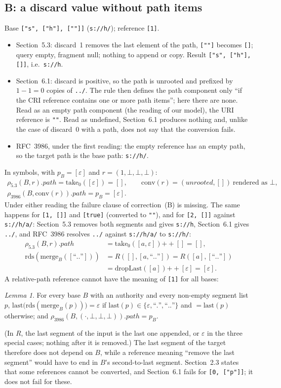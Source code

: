 \documentclass[11pt,a4paper]{article}
\theoremstyle{remark}
\newcommand{\cri}[1]{\texttt{#1}}
\newcommand{\uri}[1]{\texttt{#1}}
\newcommand{\rds}{\mathrm{rds}}
\newcommand{\mergef}{\mathrm{merge}}
\newcommand{\take}[1]{\mathrm{take}_{#1}}
\newcommand{\dl}{\mathrm{dropLast}}
\newcommand{\res}{\rho_{5.3}}
\newcommand{\rfc}{\rho_{3986}}
\newcommand{\conv}{\mathrm{conv}}
\newcommand{\e}{\varepsilon}
\newcommand{\seq}[1]{[#1]}
\newtheorem{lemma}{Lemma}
\begin{document}
\subsection{B: a discard value without path items}
Base \cri{["s", ["h"], [""]]} (\uri{s://h/}); reference \cri{[1]}.
\begin{itemize}[nosep]
\item Section~5.3: discard~1 removes the last element of the path, \cri{[""]} becomes \cri{[]}; query
empty, fragment null; nothing to append or copy. Result \cri{["s", ["h"], []]}, i.e.\ \uri{s://h}.
\item Section~6.1: discard is positive, so the path is unrooted and prefixed by $1-1=0$ copies of
\uri{../}. The rule then defines the path component only ``if the CRI reference contains one or more
path items''; here there are none. Read as an empty path component (the reading of our model), the URI
reference is \uri{""}. Read as undefined, Section~6.1 produces nothing and, unlike the case of discard~0
with a path, does not say that the conversion fails.
\item RFC~3986, under the first reading: the empty reference has an empty path, so the target path is the
base path: \uri{s://h/}.
\end{itemize}
In symbols, with $p_B=\seq{\e}$ and $r=(1,\bot,\bot,\bot)$:
\begin{gather*}
\res(B,r).\mathit{path}=\take{0}(\seq{\e})=\seq{},\qquad
\conv(r)=(\mathit{unrooted},\seq{})\ \text{rendered as }\bot,\\
\rfc(B,\conv(r)).\mathit{path}=p_B=\seq{\e}.
\end{gather*}
Under either reading the failure clause of correction~(B) is missing. The same happens for \cri{[1, []]}
and \cri{[true]} (converted to \uri{""}), and for \cri{[2, []]} against \uri{s://h/a/}: Section~5.3
removes both segments and gives \uri{s://h}, Section~6.1 gives \uri{../}, and RFC~3986 resolves
\uri{../} against \uri{s://h/a/} to \uri{s://h/}:
\begin{align*}
\res(B,r).\mathit{path}&=\take{0}(\seq{a,\e})\mathbin{+\!\!+}\seq{}=\seq{},\\
\rds(\mergef_B(\seq{\text{``..''}}))&=R(\seq{},\seq{a,\text{``..''}})=R(\seq{a},\seq{\text{``..''}})\\
&=\dl(\seq{a})\mathbin{+\!\!+}\seq{\e}=\seq{\e}.
\end{align*}
A relative-path reference cannot have the meaning of \cri{[1]} for all bases:
\begin{lemma}
For every base $B$ with an authority and every non-empty segment list $p$,
$\mathrm{last}\bigl(\rds(\mergef_B(p))\bigr)=\e$ if $\mathrm{last}(p)\in\{\e,\text{``.''},\text{``..''}\}$ and
$=\mathrm{last}(p)$ otherwise; and $\rfc(B,(\cdot,\bot,\bot,\bot)).\mathit{path}=p_B$.
\end{lemma}
\noindent (In $R$, the last segment of the input is the last one appended, or $\e$ in the three
special cases; nothing after it is removed.) The last segment of the target therefore does not depend
on $B$, while a reference meaning ``remove the last segment'' would have to end in $B$'s second-to-last
segment. Section~2.3 states that some references
cannot be converted, and Section~6.1 fails for \cri{[0, ["p"]]}; it does not fail for these.
\end{document}
